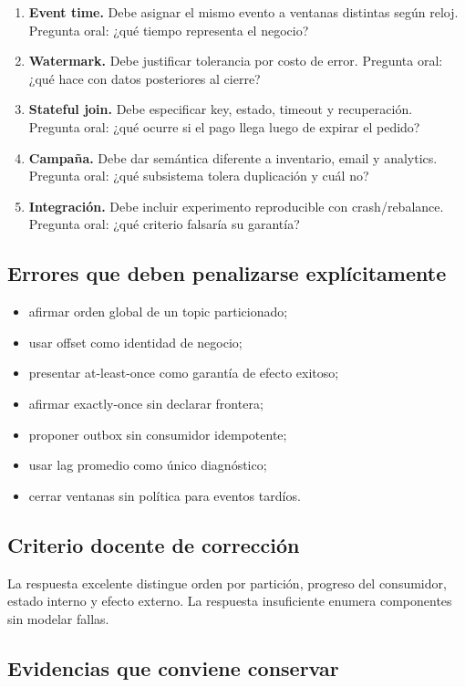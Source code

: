 \documentclass[variant=docente,cover=institutional,mode=screen]{ua-engineering-v6-article}
\begin{document}
\begin{enumerate}
\item \textbf{Event time.} Debe asignar el mismo evento a ventanas distintas según reloj. Pregunta oral: ¿qué tiempo representa el negocio?
\item \textbf{Watermark.} Debe justificar tolerancia por costo de error. Pregunta oral: ¿qué hace con datos posteriores al cierre?
\item \textbf{Stateful join.} Debe especificar key, estado, timeout y recuperación. Pregunta oral: ¿qué ocurre si el pago llega luego de expirar el pedido?
\item \textbf{Campaña.} Debe dar semántica diferente a inventario, email y analytics. Pregunta oral: ¿qué subsistema tolera duplicación y cuál no?
\item \textbf{Integración.} Debe incluir experimento reproducible con crash/rebalance. Pregunta oral: ¿qué criterio falsaría su garantía?
\end{enumerate}

\subsection{Errores que deben penalizarse explícitamente}

\begin{itemize}
\item afirmar orden global de un topic particionado;
\item usar offset como identidad de negocio;
\item presentar at-least-once como garantía de efecto exitoso;
\item afirmar exactly-once sin declarar frontera;
\item proponer outbox sin consumidor idempotente;
\item usar lag promedio como único diagnóstico;
\item cerrar ventanas sin política para eventos tardíos.
\end{itemize}

\subsection{Criterio docente de corrección}
La respuesta excelente distingue orden por partición, progreso del consumidor, estado interno y efecto externo. La respuesta insuficiente enumera componentes sin modelar fallas.

\subsection{Evidencias que conviene conservar}
\end{document}
